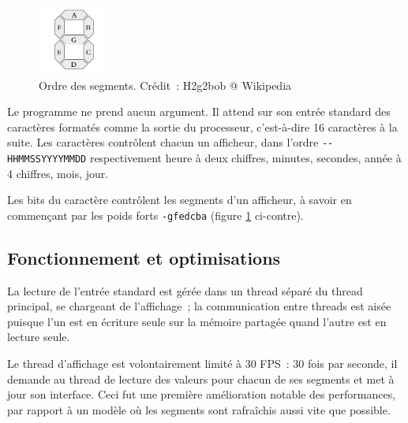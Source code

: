 \documentclass[11pt,a4paper]{article}
\begin{document}
\begin{figure}
\begin{center}
\vspace{-1em}
\includegraphics[width=0.2\textwidth]{imgs/7seg-labels.png}
\end{center}
\vspace{-2em}
\caption{Ordre des segments. Crédit~: H2g2bob @ Wikipedia}
\label{fig:segorder}
\vspace{-2em}
\end{figure}

Le programme ne prend aucun argument. Il attend sur son entrée standard des caractères formatés comme la sortie du processeur, c'est-à-dire 16 caractères à la suite. Les caractères contrôlent chacun un afficheur, dans l'ordre \verb!--HHMMSSYYYYMMDD! respectivement heure à deux chiffres, minutes, secondes, année à 4 chiffres, mois, jour.

Les bits du caractère contrôlent les segments d'un afficheur, à savoir en commençant par les poids forts \verb!-gfedcba! (figure \ref{fig:segorder} ci-contre).

\subsection{Fonctionnement et optimisations}

La lecture de l'entrée standard est gérée dans un thread séparé du thread principal, se chargeant de l'affichage~; la communication entre threads est aisée puisque l'un est en écriture seule sur la mémoire partagée quand l'autre est en lecture seule.

Le thread d'affichage est volontairement limité à 30 FPS~: 30 fois par seconde, il demande au thread de lecture des valeurs pour chacun de ses segments et met à jour son interface. Ceci fut une première amélioration notable des performances, par rapport à un modèle où les segments sont rafraîchis aussi vite que possible.
\end{document}
